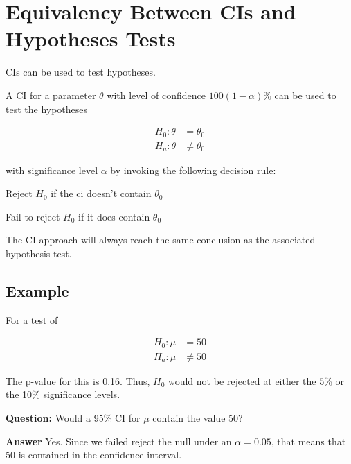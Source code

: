 \section*{Equivalency Between CIs and Hypotheses Tests}

CIs can be used to test hypotheses. 

A CI for a parameter $\theta$ with level of confidence $100(1 - \alpha)\%$ can be used to test the hypotheses

\[
	\begin{aligned}
		H_0: \theta &= \theta_0 \\
		H_a: \theta &\neq \theta_0
	\end{aligned}
\]

with significance level $\alpha$ by invoking the following decision rule:

Reject $H_0$ if the ci doesn't contain $\theta_0$

Fail to reject $H_0$ if it does contain $\theta_0$

The CI approach will always reach the same conclusion as the associated hypothesis test.

\subsection{Example}

For a test of 

\[
	\begin{aligned}
		H_0: \mu &= 50 \\
		H_a: \mu &\neq 50
	\end{aligned}
\]

The p-value for this is 0.16. Thus, $H_0$ would not be rejected at either the 5\% or the 10\% significance levels.

\textbf{Question:} Would a 95\% CI for $\mu$ contain the value 50?

\textbf{Answer} Yes. Since we failed reject the null under an $\alpha = 0.05$, that means that 50 is contained in the confidence interval.
